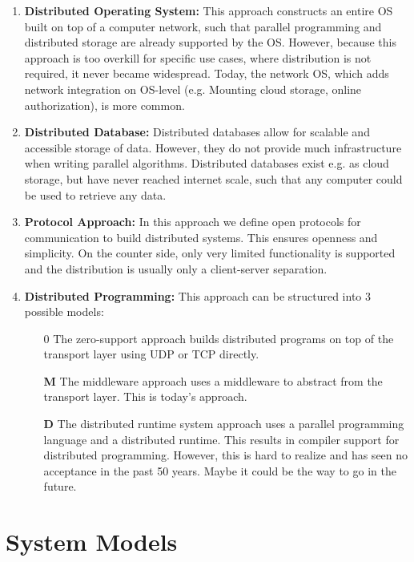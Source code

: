 \begin{enumerate}
    \item \textbf{Distributed Operating System:} This approach constructs an entire \ac{OS} built on top of a computer network, such that parallel programming and distributed storage are already supported by the \ac{OS}. However, because this approach is too overkill for specific use cases, where distribution is not required, it never became widespread. Today, the network \ac{OS}, which adds network integration on \ac{OS}-level (e.g. Mounting cloud storage, online authorization), is more common.
    \item \textbf{Distributed Database:} Distributed databases allow for scalable and accessible storage of data. However, they do not provide much infrastructure when writing parallel algorithms. Distributed databases exist e.g. as cloud storage, but have never reached internet scale, such that any computer could be used to retrieve any data.
    \item \textbf{Protocol Approach:} In this approach we define open protocols for communication to build distributed systems. This ensures openness and simplicity. On the counter side, only very limited functionality is supported and the distribution is usually only a client-server separation.
    \item \textbf{Distributed Programming:} This approach can be structured into 3 possible models:
          \begin{itemize}
              \item[$0$] The zero-support approach builds distributed programs on top of the transport layer using UDP or TCP directly.
              \item[\textbf{M}] The middleware approach uses a middleware to abstract from the transport layer. This is today's approach.
              \item[\textbf{D}] The distributed runtime system approach uses a parallel programming language and a distributed runtime. This results in compiler support for distributed programming. However, this is hard to realize and has seen no acceptance in the past 50 years. Maybe it could be the way to go in the future.
          \end{itemize}
\end{enumerate}

\section{System Models}

